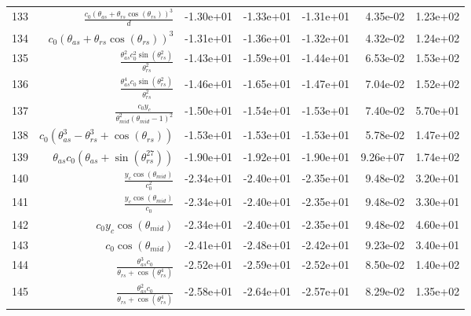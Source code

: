 \begin{tabularx}{\textwidth}{lRRRRRl}
133  &  $ \displaystyle\frac{c_{0} \left(\theta_{as} + \theta_{rs} \cos{\left(\theta_{rs} \right)}\right)^{3}}{d} $  &  -1.30e+01  &  -1.33e+01  &  -1.31e+01  &  4.35e-02  &  1.23e+02  \\ 
134  &  $ c_{0} \left(\theta_{as} + \theta_{rs} \cos{\left(\theta_{rs} \right)}\right)^{3} $  &  -1.31e+01  &  -1.36e+01  &  -1.32e+01  &  4.32e-02  &  1.24e+02  \\ 
135  &  $ \displaystyle\frac{\theta_{as}^{2} c_{0}^{2} \sin{\left(\theta_{rs}^{2} \right)}}{\theta_{rs}^{2}} $  &  -1.43e+01  &  -1.59e+01  &  -1.44e+01  &  6.53e-02  &  1.53e+02  \\ 
136  &  $ \displaystyle\frac{\theta_{as}^{4} c_{0} \sin{\left(\theta_{rs}^{2} \right)}}{\theta_{rs}^{2}} $  &  -1.46e+01  &  -1.65e+01  &  -1.47e+01  &  7.04e-02  &  1.52e+02  \\ 
137  &  $ \displaystyle\frac{c_{0} y_c}{\theta_{mid}^{2} \left(\theta_{mid} - 1\right)^{2}} $  &  -1.50e+01  &  -1.54e+01  &  -1.53e+01  &  7.40e-02  &  5.70e+01  \\ 
138  &  $ c_{0} \left(\theta_{as}^{3} - \theta_{rs}^{3} + \cos{\left(\theta_{rs} \right)}\right) $  &  -1.53e+01  &  -1.53e+01  &  -1.53e+01  &  5.78e-02  &  1.47e+02  \\ 
139  &  $ \theta_{as} c_{0} \left(\theta_{as} + \sin{\left(\theta_{rs}^{27} \right)}\right) $  &  -1.90e+01  &  -1.92e+01  &  -1.90e+01  &  9.26e+07  &  1.74e+02  \\ 
140  &  $ \displaystyle\frac{y_c \cos{\left(\theta_{mid} \right)}}{c_{0}^{2}} $  &  -2.34e+01  &  -2.40e+01  &  -2.35e+01  &  9.48e-02  &  3.20e+01  \\ 
141  &  $ \displaystyle\frac{y_c \cos{\left(\theta_{mid} \right)}}{c_{0}} $  &  -2.34e+01  &  -2.40e+01  &  -2.35e+01  &  9.48e-02  &  3.30e+01  \\ 
142  &  $ c_{0} y_c \cos{\left(\theta_{mid} \right)} $  &  -2.34e+01  &  -2.40e+01  &  -2.35e+01  &  9.48e-02  &  4.60e+01  \\ 
143  &  $ c_{0} \cos{\left(\theta_{mid} \right)} $  &  -2.41e+01  &  -2.48e+01  &  -2.42e+01  &  9.23e-02  &  3.40e+01  \\ 
144  &  $ \displaystyle\frac{\theta_{as}^{3} c_{0}}{\theta_{rs} + \cos{\left(\theta_{rs}^{4} \right)}} $  &  -2.52e+01  &  -2.59e+01  &  -2.52e+01  &  8.50e-02  &  1.40e+02  \\ 
145  &  $ \displaystyle\frac{\theta_{as}^{2} c_{0}}{\theta_{rs} + \cos{\left(\theta_{rs}^{4} \right)}} $  &  -2.58e+01  &  -2.64e+01  &  -2.57e+01  &  8.29e-02  &  1.35e+02  \\ 

\end{tabularx}
